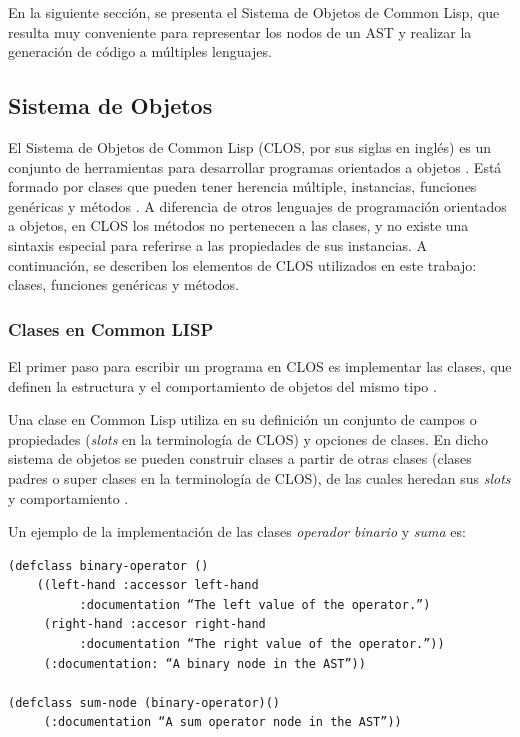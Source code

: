 
En la siguiente sección, se presenta el Sistema de Objetos de Common Lisp, que resulta muy conveniente para representar los nodos de un AST y realizar la generación de código a múltiples lenguajes.

\subsection{Sistema de Objetos}


El Sistema de Objetos de Common Lisp (CLOS, por sus siglas en inglés) es un conjunto de herramientas para desarrollar programas orientados a objetos \cite{sonya}. Está formado por clases que pueden tener herencia múltiple, instancias, funciones genéricas y métodos \cite{practical-common-lisp}. A diferencia de otros lenguajes de programación orientados a objetos, en CLOS los métodos no pertenecen a las clases, y no existe una sintaxis especial para referirse a las propiedades de sus instancias. A continuación, se describen los elementos de CLOS utilizados en este trabajo: clases, funciones genéricas y métodos.

\subsubsection{Clases en Common LISP}
\label{:sec clases en lisp}
El primer paso para escribir un programa en CLOS es implementar las clases, que definen la estructura y el comportamiento de objetos del mismo tipo \cite{sonya}\cite{clos-overview}.

Una clase en Common Lisp utiliza en su definición un conjunto de campos o propiedades (\textit{slots} en la terminología de CLOS) y opciones de clases. En dicho sistema de objetos se pueden construir clases a partir de otras clases (clases padres o super clases en la terminología de CLOS), de las cuales heredan sus \textit{slots} y comportamiento \cite{clos-overview}\cite{successful-lisp}.

Un ejemplo de la implementación de las clases \textit{operador binario} y \textit{suma} es:
\begin{verbatim}
(defclass binary-operator ()
    ((left-hand :accessor left-hand
          :documentation “The left value of the operator.”)
     (right-hand :accesor right-hand
          :documentation “The right value of the operator.”))
     (:documentation: “A binary node in the AST”))

(defclass sum-node (binary-operator)()
     (:documentation “A sum operator node in the AST”))
\end{verbatim}

